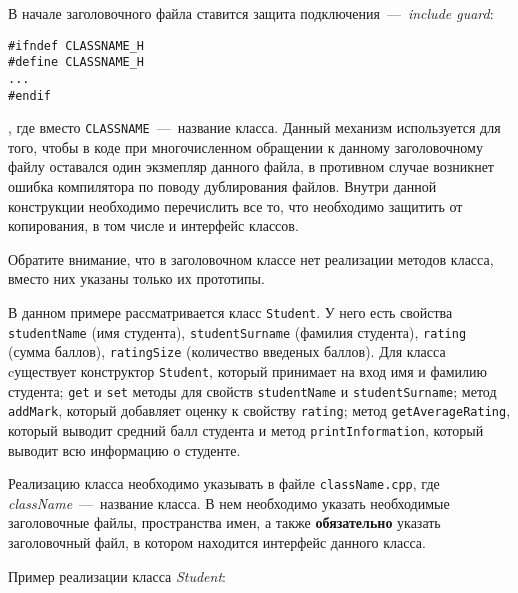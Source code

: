 В начале заголовочного файла ставится защита подключения~---~\emph{include guard}:

\begin{lstlisting}
#ifndef CLASSNAME_H
#define CLASSNAME_H
...
#endif
\end{lstlisting}

, где вместо \lstinline|CLASSNAME|~---~название класса. Данный механизм используется для того, чтобы в коде при многочисленном обращении к данному заголовочному файлу оставался один экзмепляр данного файла, в противном случае возникнет ошибка компилятора по поводу дублирования файлов. Внутри данной конструкции необходимо перечислить все то, что необходимо защитить от копирования, в том числе и интерфейс классов.

Обратите внимание, что в заголовочном классе нет реализации методов класса, вместо них указаны только их прототипы. 

В данном примере рассматривается класс \lstinline|Student|. У него есть свойства \lstinline|studentName| (имя студента), \lstinline|studentSurname| (фамилия студента), \lstinline|rating| (сумма баллов), \lstinline|ratingSize| (количество введеных баллов). Для класса cуществует конструктор \lstinline|Student|, который принимает на вход имя и фамилию студента; \lstinline|get| и \lstinline|set| методы для свойств \lstinline|studentName| и \lstinline|studentSurname|; метод \lstinline|addMark|, который добавляет оценку к свойству \lstinline|rating|; метод \lstinline|getAverageRating|, который выводит средний балл студента и метод \lstinline|printInformation|, который выводит всю информацию о студенте. 

Реализацию класса необходимо указывать в файле \lstinline|className.cpp|, где \emph{className}~---~название класса. В нем необходимо указать необходимые заголовочные файлы, пространства имен, а также \textbf{обязательно} указать заголовочный файл, в котором находится интерфейс данного класса.

Пример реализации класса \emph{Student}:

